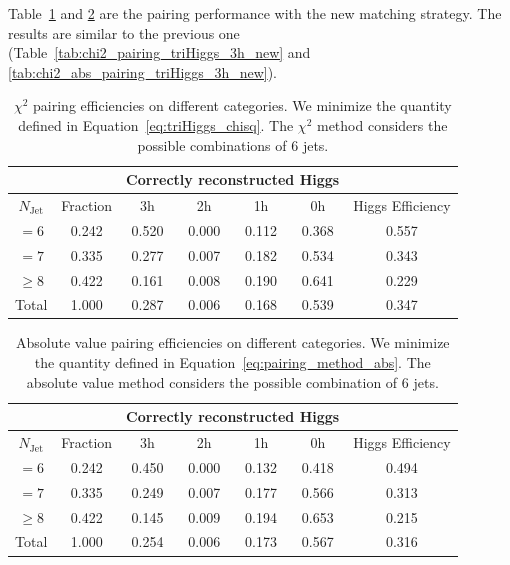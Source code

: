 \documentclass[12pt]{article}
\begin{document}
    Table~\ref{tab:chi2_pairing_triHiggs_3h_new_match} and \ref{tab:abs_pairing_triHiggs_3h_new_match} are the pairing performance with the new matching strategy. The results are similar to the previous one (Table~\ref{tab:chi2_pairing_triHiggs_3h_new} and \ref{tab:chi2_abs_pairing_triHiggs_3h_new}).
    \begin{table}[htpb]
        \centering
        \caption{$\chi^2$ pairing efficiencies on different categories. We minimize the quantity defined in Equation~\ref{eq:triHiggs_chisq}. The $\chi^2$ method considers the possible combinations of 6 jets.}
        \label{tab:chi2_pairing_triHiggs_3h_new_match}
        \begin{tabular}{c|c|cccc|c}
        \multicolumn{1}{l|}{} &          & \multicolumn{4}{c|}{Correctly reconstructed Higgs} & \multicolumn{1}{l}{} \\ \hline
        $N_\text{Jet}$        & Fraction & 3h          & 2h         & 1h         & 0h         & Higgs Efficiency     \\ \hline
        $=6$                  & 0.242 & 0.520 & 0.000 & 0.112 & 0.368 & 0.557 \\
        $=7$                  & 0.335 & 0.277 & 0.007 & 0.182 & 0.534 & 0.343 \\
        $\ge 8$               & 0.422 & 0.161 & 0.008 & 0.190 & 0.641 & 0.229 \\ \hline
        Total                 & 1.000 & 0.287 & 0.006 & 0.168 & 0.539 & 0.347
        \end{tabular}
    \end{table}
    \begin{table}[htpb]
        \centering
        \caption{Absolute value pairing efficiencies on different categories. We minimize the quantity defined in Equation~\ref{eq:pairing_method_abs}. The absolute value method considers the possible combination of 6 jets.}
        \label{tab:abs_pairing_triHiggs_3h_new_match}
        \begin{tabular}{c|c|cccc|c}
        \multicolumn{1}{l|}{} &          & \multicolumn{4}{c|}{Correctly reconstructed Higgs} & \multicolumn{1}{l}{} \\ \hline
        $N_\text{Jet}$        & Fraction & 3h          & 2h         & 1h         & 0h         & Higgs Efficiency     \\ \hline
        $=6$                  & 0.242 & 0.450 & 0.000 & 0.132 & 0.418 & 0.494 \\
        $=7$                  & 0.335 & 0.249 & 0.007 & 0.177 & 0.566 & 0.313 \\
        $\ge 8$               & 0.422 & 0.145 & 0.009 & 0.194 & 0.653 & 0.215 \\ \hline
        Total                 & 1.000 & 0.254 & 0.006 & 0.173 & 0.567 & 0.316
        \end{tabular}
    \end{table}
\end{document}
